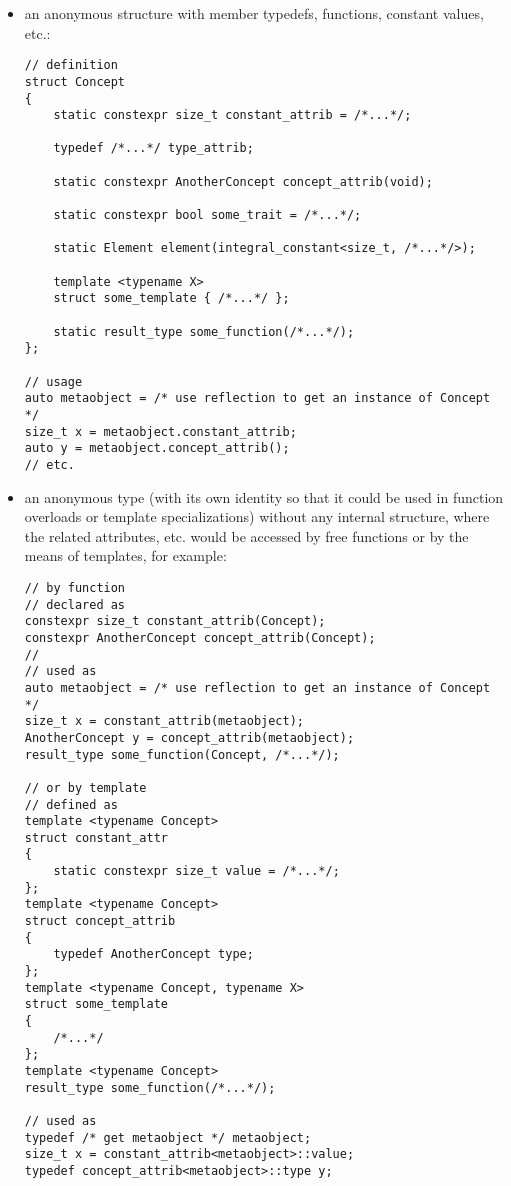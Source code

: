 \begin{itemize}
\item an anonymous structure with member typedefs, functions, constant values, etc.:
\begin{verbatim}
// definition
struct Concept
{
	static constexpr size_t constant_attrib = /*...*/;

	typedef /*...*/ type_attrib;

	static constexpr AnotherConcept concept_attrib(void);

	static constexpr bool some_trait = /*...*/;

	static Element element(integral_constant<size_t, /*...*/>);

	template <typename X>
	struct some_template { /*...*/ };

	static result_type some_function(/*...*/);
};

// usage
auto metaobject = /* use reflection to get an instance of Concept */
size_t x = metaobject.constant_attrib;
auto y = metaobject.concept_attrib();
// etc.
\end{verbatim}

\item an anonymous type (with its own identity so that it could be used
in function overloads or template specializations) without any internal structure,
where the related attributes, etc. would be accessed by free functions or
by the means of templates, for example:
\begin{verbatim}
// by function
// declared as
constexpr size_t constant_attrib(Concept);
constexpr AnotherConcept concept_attrib(Concept);
//
// used as
auto metaobject = /* use reflection to get an instance of Concept */
size_t x = constant_attrib(metaobject);
AnotherConcept y = concept_attrib(metaobject);
result_type some_function(Concept, /*...*/);

// or by template
// defined as
template <typename Concept>
struct constant_attr
{
	static constexpr size_t value = /*...*/;
};
template <typename Concept>
struct concept_attrib
{
	typedef AnotherConcept type;
};
template <typename Concept, typename X>
struct some_template
{
	/*...*/
};
template <typename Concept>
result_type some_function(/*...*/);

// used as
typedef /* get metaobject */ metaobject;
size_t x = constant_attrib<metaobject>::value;
typedef concept_attrib<metaobject>::type y;
\end{verbatim}

\end{itemize}

